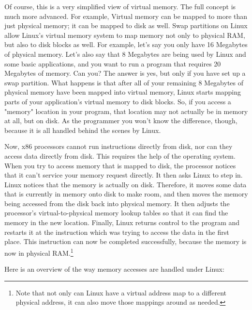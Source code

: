 Of course, this is a very simplified view of virtual memory.  The full 
concept is much more advanced.  For example, 
Virtual memory can be mapped to more than just physical memory; it
can be mapped to disk as well.  Swap partitions on Linux allow
Linux's virtual memory system to map memory not only to physical RAM,
but also to disk blocks as well.  For example, let's
say you only have 16 Megabytes of physical memory.  Let's also say that
8 Megabytes are being used by Linux and some basic applications, and you
want to run a program that requires 20 Megabytes of memory.  Can you?  The
answer is yes, but only if you have set up a swap partition.  What
happens is that after all of your remaining 8 Megabytes of physical memory
have been mapped into virtual memory, Linux starts mapping parts of your application's
virtual memory to disk blocks.  So, if you access a "memory" location in your
program, that location may not actually be in memory at all, but on
disk.  As the programmer you won't know the difference, though, because 
it is all handled behind the scenes by Linux.

Now, x86 processors cannot run instructions directly from disk, nor can
they access data directly from disk.  This requires the help of the operating
system.  When you try to access memory that is mapped to disk, the processor
notices that it can't service your memory request directly.  It then asks
Linux to step in.  Linux notices that the memory
is actually on disk.  Therefore, it moves some data that is currently in 
memory onto disk to make room, and then moves the memory being accessed
from the disk back into physical memory.  It then adjusts the processor's
virtual-to-physical memory lookup tables so that it can find the memory in
the new location.  Finally, Linux returns control to the program and restarts
it at the instruction which was trying to access the data in the first place.  
This instruction can now be completed successfully, 
because the memory is now in physical RAM.\footnote{Note that not only 
can Linux have a virtual address map to a different
physical address, it can also move those mappings around as needed.
}

Here is an overview of the way memory accesses are handled under Linux:


